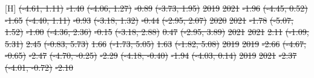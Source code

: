 \documentclass[
  letterpaper,
  DIV=11,
  numbers=noendperiod]{scrartcl}
\makeatletter
\renewenvironment{table}%
   {\renewcommand\familydefault\sfdefault
    \@float{table}}
   {\end@float}
\providecommand{\DIFdel}[1]{{\protect\color{red}\sout{#1}}}                      %
\providecommand{\DIFdelFL}[1]{\DIFdel{#1}} %
\makeatother
\begin{document}
\begin{table}[H]
\DIFdelFL{(-4.61, 1.11) }%
\DIFdelFL{-1.40 }%
\DIFdelFL{(-4.06, 1.27) }%
\DIFdelFL{-0.89 }%
\DIFdelFL{(-3.73, 1.95)}%
\DIFdelFL{\hspace{1em}2019 }%
\DIFdelFL{2021 }%
\DIFdelFL{-1.96 }%
\DIFdelFL{(-4.45, 0.52) }%
\DIFdelFL{-1.65 }%
\DIFdelFL{(-4.40, 1.11) }%
\DIFdelFL{-0.93 }%
\DIFdelFL{(-3.18, 1.32) }%
\DIFdelFL{-0.44 }%
\DIFdelFL{(-2.95, 2.07)}%
\DIFdelFL{\hspace{1em}2020 }%
\DIFdelFL{2021 }%
\DIFdelFL{-1.78 }%
\DIFdelFL{(-5.07, 1.52) }%
\DIFdelFL{-1.00 }%
\DIFdelFL{(-4.36, 2.36) }%
\DIFdelFL{-0.15 }%
\DIFdelFL{(-3.18, 2.88) }%
\DIFdelFL{0.47 }%
\DIFdelFL{(-2.95, 3.89)}%
\DIFdelFL{\hspace{1em}2021 }%
\DIFdelFL{2021 }%
\DIFdelFL{2.11 }%
\DIFdelFL{(-1.09, 5.31) }%
\DIFdelFL{2.45 }%
\DIFdelFL{(-0.83, 5.73) }%
\DIFdelFL{1.66 }%
\DIFdelFL{(-1.73, 5.05) }%
\DIFdelFL{1.63 }%
\DIFdelFL{(-1.82, 5.08)}%
\DIFdelFL{\hspace{1em}2019 }%
\DIFdelFL{2019 }%
\DIFdelFL{-2.66 }%
\DIFdelFL{(-4.67, -0.65) }%
\DIFdelFL{-2.47 }%
\DIFdelFL{(-4.70, -0.25) }%
\DIFdelFL{-2.29 }%
\DIFdelFL{(-4.18, -0.40) }%
\DIFdelFL{-1.94 }%
\DIFdelFL{(-4.03, 0.14)}%
\DIFdelFL{\hspace{1em}2019 }%
\DIFdelFL{2021 }%
\DIFdelFL{-2.37 }%
\DIFdelFL{(-4.01, -0.72) }%
\DIFdelFL{-2.10 }%

\end{table}
\end{document}
